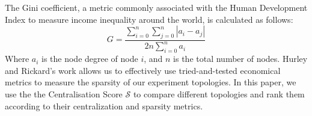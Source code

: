 The Gini coefficient, a metric commonly associated with the Human Development Index to measure income inequality around the world, is calculated as follows:
$$
G = \frac{\sum_{i=0}^n \sum_{j=0}^n |a_i - a_j|}{2n \sum_{i=0}^n a_i}
$$
Where $a_i$ is the node degree of node $i$, and $n$ is the total number of nodes.
Hurley and Rickard's work allows us to effectively use tried-and-tested economical metrics to measure the sparsity of our experiment topologies.
In this paper, we use the the Centralisation Score $\mathcal{S}$ to compare different topologies and rank them according to their centralization and sparsity metrics.
